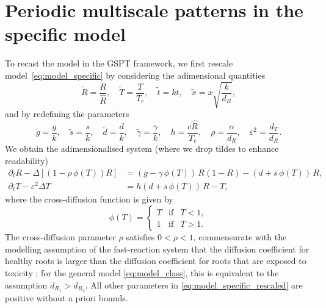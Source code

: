 \documentclass[a4paper,10pt,abstract=true,parskip=true]{scrartcl}
\theoremstyle{remark}
\numberwithin{equation}{section}
\numberwithin{thm}{section}
\newcommand{\eps}{\varepsilon}
\begin{document}
\section{Periodic multiscale patterns in the specific model}\label{sec:patterns_specific}

To recast the model in the GSPT framework, we first rescale model~\eqref{eq:model_specific} by considering the adimensional quantities
\begin{equation}
    \tilde{R} = \frac{R}{\hat{R}}, \quad \tilde{T} = \frac{T}{T_c}, \quad \tilde{t} = k t, \quad \tilde{x} = x\sqrt{\frac{k}{d_R}},
\end{equation}
and by redefining the parameters
\begin{equation}
    \tilde{g} = \frac{g}{k}, \quad \tilde{s} = \frac{s}{k}, \quad \tilde{d} = \frac{d}{k}, \quad \tilde{\gamma} = \frac{\gamma}{k}, \quad h = \frac{c \hat{R}}{T_c}, \quad \rho 
    = \frac{\alpha}{d_R},  \quad \eps^2 = \frac{d_T}{d_R}.
\end{equation}
We obtain the adimensionalised system 
(where we drop tildes to enhance readability)
\begin{subequations}\label{eq:model_specific_rescaled}
\begin{align}
 \partial_t R - \Delta \left[(1 - \rho\,\phi(T))R\right] &= (g - \gamma\,\phi(T))\,R\left(1-R\right) - (d+s\,\phi(T))\,R, \label{eq:model_specific_R_rescaled}\\
 \partial_t T - \eps^2 \Delta T &= h(d+s\,\phi(T))\,R-T\label{eq:model_specific_T_rescaled},
\end{align}
\end{subequations}
where the cross-diffusion function is given by
\begin{equation}\label{eq:def_phiT}
        \phi(T) = \left\{\begin{array}{rcl} T & \text{if} & T< 1,\\ 1 & \text{if} & T>1.\end{array}\right. 
\end{equation}
The cross-diffusion parameter $\rho$ satisfies $0<\rho<1$, commensurate with the modelling assumption of the fast-reaction system that the diffusion coefficient for healthy roots is larger than the diffusion coefficient for roots that are exposed to toxicity \cite{GIS_2026}; for the general model \eqref{eq:model_class}, this is equivalent to the assumption $d_{R_1}>d_{R_2}$. All other parameters in \eqref{eq:model_specific_rescaled} are positive without a priori bounds.
\end{document}
